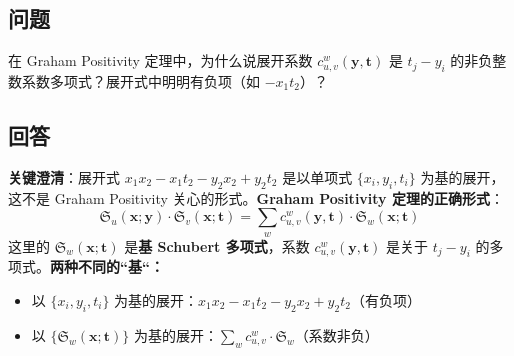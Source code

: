 \subsection{问题}
在 Graham Positivity 定理中，为什么说展开系数 $c^w_{u,v}(\mathbf{y}, \mathbf{t})$ 是 $t_j - y_i$ 的非负整数系数多项式？展开式中明明有负项（如 $-x_1t_2$）？
\subsection{回答}
\textbf{关键澄清}：展开式 $x_1x_2 - x_1t_2 - y_2x_2 + y_2t_2$ 是以单项式 $\{x_i, y_i, t_i\}$ 为基的展开，这不是 Graham Positivity 关心的形式。\textbf{Graham Positivity 定理的正确形式}：$$\mathfrak{S}_u(\mathbf{x}; \mathbf{y}) \cdot \mathfrak{S}_v(\mathbf{x}; \mathbf{t}) = \sum_w c^w_{u,v}(\mathbf{y}, \mathbf{t}) \cdot \mathfrak{S}_w(\mathbf{x}; \mathbf{t})$$这里的 $\mathfrak{S}_w(\mathbf{x}; \mathbf{t})$ 是\textbf{基 Schubert 多项式}，系数 $c^w_{u,v}(\mathbf{y}, \mathbf{t})$ 是关于 $t_j - y_i$ 的多项式。\textbf{两种不同的``基``：}
\begin{itemize}
\item 以 $\{x_i, y_i, t_i\}$ 为基的展开：$x_1x_2 - x_1t_2 - y_2x_2 + y_2t_2$（有负项）
\item 以 $\{\mathfrak{S}_w(\mathbf{x}; \mathbf{t})\}$ 为基的展开：$\sum_w c^w_{u,v} \cdot \mathfrak{S}_w$（系数非负）
\end{itemize}
